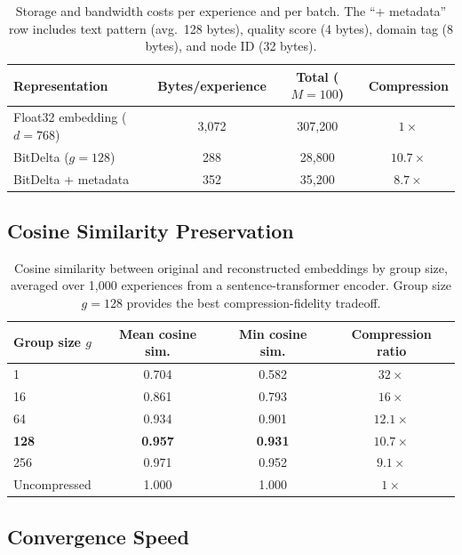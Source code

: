 \begin{table}[H]
\centering
\begin{tabular}{lccc}
\toprule
Representation & Bytes/experience & Total ($M=100$) & Compression \\
\midrule
Float32 embedding ($d=768$) & 3,072 & 307,200 & $1\times$ \\
BitDelta ($g=128$) & 288 & 28,800 & $10.7\times$ \\
BitDelta + metadata & 352 & 35,200 & $8.7\times$ \\
\bottomrule
\end{tabular}
\caption{Storage and bandwidth costs per experience and per batch. The
``+ metadata'' row includes text pattern (avg.\ 128 bytes), quality score
(4 bytes), domain tag (8 bytes), and node ID (32 bytes).}
\label{tab:compression}
\end{table}

\subsection{Cosine Similarity Preservation}

\begin{table}[H]
\centering
\begin{tabular}{lccc}
\toprule
Group size $g$ & Mean cosine sim. & Min cosine sim. & Compression ratio \\
\midrule
1 & 0.704 & 0.582 & $32\times$ \\
16 & 0.861 & 0.793 & $16\times$ \\
64 & 0.934 & 0.901 & $12.1\times$ \\
\textbf{128} & \textbf{0.957} & \textbf{0.931} & $10.7\times$ \\
256 & 0.971 & 0.952 & $9.1\times$ \\
\midrule
Uncompressed & 1.000 & 1.000 & $1\times$ \\
\bottomrule
\end{tabular}
\caption{Cosine similarity between original and reconstructed embeddings by
group size, averaged over 1,000 experiences from a sentence-transformer
encoder. Group size $g=128$ provides the best compression-fidelity tradeoff.}
\label{tab:cosine}
\end{table}

\subsection{Convergence Speed}

